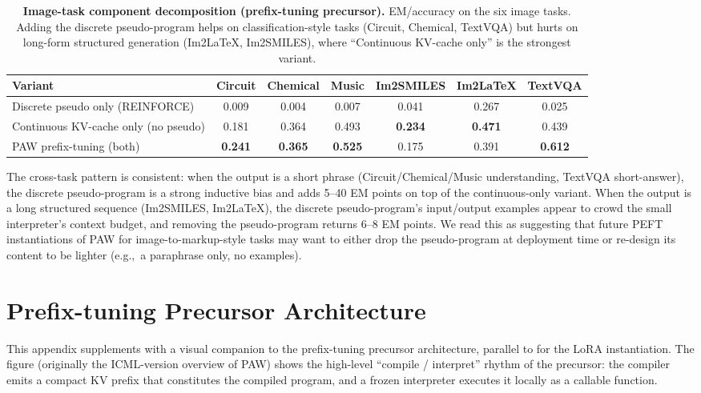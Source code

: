 \begin{table}[h]
\centering
\caption{\label{tab:image_ablations}\textbf{Image-task component decomposition (prefix-tuning precursor).} EM/accuracy on the six image tasks. Adding the discrete pseudo-program helps on classification-style tasks (Circuit, Chemical, TextVQA) but hurts on long-form structured generation (Im2LaTeX, Im2SMILES), where ``Continuous KV-cache only'' is the strongest variant.}
\small
\setlength{\tabcolsep}{4pt}
\begin{tabular}{@{}lcccccc@{}}
\toprule
Variant & Circuit & Chemical & Music & Im2SMILES & Im2LaTeX & TextVQA \\
\midrule
Discrete pseudo only (REINFORCE)         & 0.009 & 0.004 & 0.007 & 0.041 & 0.267 & 0.025 \\
Continuous KV-cache only (no pseudo)     & 0.181 & 0.364 & 0.493 & \textbf{0.234} & \textbf{0.471} & 0.439 \\
PAW prefix-tuning (both)                 & \textbf{0.241} & \textbf{0.365} & \textbf{0.525} & 0.175 & 0.391 & \textbf{0.612} \\
\bottomrule
\end{tabular}
\end{table}

The cross-task pattern is consistent: when the output is a short phrase (Circuit/Chemical/Music understanding, TextVQA short-answer), the discrete pseudo-program is a strong inductive bias and adds 5--40 EM points on top of the continuous-only variant. When the output is a long structured sequence (Im2SMILES, Im2LaTeX), the discrete pseudo-program's input/output examples appear to crowd the small interpreter's context budget, and removing the pseudo-program returns 6--8 EM points. We read this as suggesting that future PEFT instantiations of PAW for image-to-markup-style tasks may want to either drop the pseudo-program at deployment time or re-design its content to be lighter (e.g.,\ a paraphrase only, no examples).


\section{Prefix-tuning Precursor Architecture}
\label{appendix:architecture_prefix}

This appendix supplements  with a visual companion to the prefix-tuning precursor architecture, parallel to  for the LoRA instantiation. The figure (originally the ICML-version overview of PAW) shows the high-level ``compile / interpret'' rhythm of the precursor: the compiler emits a compact KV prefix that constitutes the compiled program, and a frozen interpreter executes it locally as a callable function.

